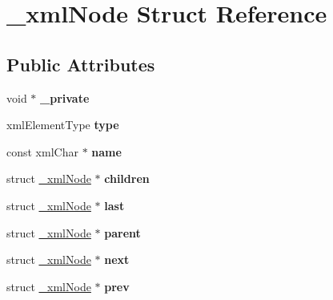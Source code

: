 \hypertarget{struct__xml_node}{}\section{\+\_\+xml\+Node Struct Reference}
\label{struct__xml_node}
\subsection*{Public Attributes}
\begin{DoxyCompactItemize}
\item 
\mbox{\label{struct__xml_node_a2872be79ee1c9154643d123e96766d4c}} 
void $\ast$ {\bfseries \+\_\+private}
\item 
\mbox{\label{struct__xml_node_acdcf66240b9c7959ff5ff4221ef725b4}} 
xml\+Element\+Type {\bfseries type}
\item 
\mbox{\label{struct__xml_node_a8629b4d6c8ca0cf48a4104e5546bf06d}} 
const xml\+Char $\ast$ {\bfseries name}
\item 
\mbox{\label{struct__xml_node_a35263b67ca130530ea776e8e3e5f25ae}} 
struct \mbox{\hyperlink{struct__xml_node}{\+\_\+xml\+Node}} $\ast$ {\bfseries children}
\item 
\mbox{\label{struct__xml_node_ac8f70a320c5a645a77f80d83d690d059}} 
struct \mbox{\hyperlink{struct__xml_node}{\+\_\+xml\+Node}} $\ast$ {\bfseries last}
\item 
\mbox{\label{struct__xml_node_ad6cfdc4df4af5288af3e5f0ec6eb8f25}} 
struct \mbox{\hyperlink{struct__xml_node}{\+\_\+xml\+Node}} $\ast$ {\bfseries parent}
\item 
\mbox{\label{struct__xml_node_a3c5c796cc508a8c57f9dfb87326be2c7}} 
struct \mbox{\hyperlink{struct__xml_node}{\+\_\+xml\+Node}} $\ast$ {\bfseries next}
\item 
\mbox{\label{struct__xml_node_ae6a5ad30b68f25b84c4a2a7baf4d1b2d}} 
struct \mbox{\hyperlink{struct__xml_node}{\+\_\+xml\+Node}} $\ast$ {\bfseries prev}
\item 
\mbox{\label{struct__xml_node_a5b43d2951be50d7c213db8f6bea15759}} 

\end{DoxyCompactItemize}
